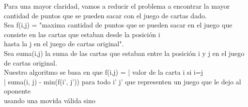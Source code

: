 \documentclass[11pt, a4paper, twoside]{article}
\begin{document}
{}

Para una mayor claridad, vamos a reducir el problema a encontrar la mayor cantidad de puntos que se pueden sacar con el juego de cartas dado.\\
Sea f(i,j) = "maxima cantidad de puntos que se pueden sacar en el juego que consiste en las cartas que estaban desde la posición i \\
hasta la j en el juego de cartas original".\\
Sea suma(i,j) la suma de las cartas que estaban entre la posición i y j en el juego de cartas original.\\
Nuestro algoritmo se basa en que f(i,j) =   | valor de la carta i      si i=j\\
                                            | suma(i, j) - min(f(i', j')) para todo i' j' que representen un juego que le dejo al oponente\\
                                              usando una movida válida        sino\\
\\

\end{document}
